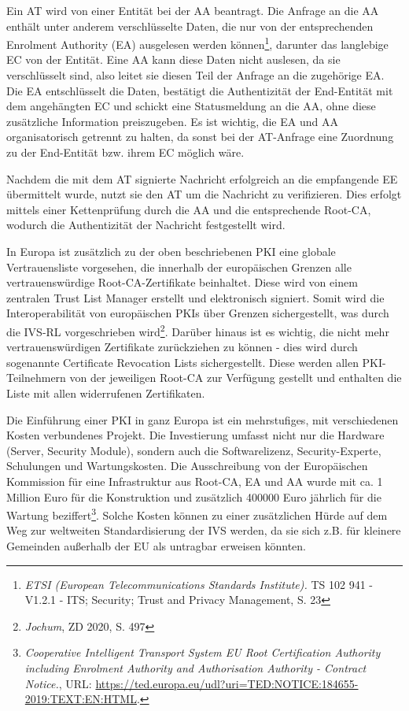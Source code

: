 Ein AT wird von einer Entität bei der AA beantragt. Die Anfrage an die AA enthält unter anderem verschlüsselte Daten, die nur von der entsprechenden Enrolment Authority (EA) ausgelesen werden können\footnote{\emph{ETSI (European Telecommunications Standards Institute).} TS 102 941 - V1.2.1 - ITS; Security; Trust and Privacy Management, S. 23}\nocite{ETSI2018}, darunter das langlebige EC von der Entität. Eine AA kann diese Daten nicht auslesen, da sie verschlüsselt sind, also leitet sie diesen Teil der Anfrage an die zugehörige EA. Die EA entschlüsselt die Daten, bestätigt die Authentizität der End-Entität mit dem angehängten EC und schickt eine Statusmeldung an die AA, ohne diese zusätzliche Information preiszugeben. Es ist wichtig, die EA und AA organisatorisch getrennt zu halten, da sonst bei der AT-Anfrage eine Zuordnung zu der End-Entität bzw. ihrem EC möglich wäre.

Nachdem die mit dem AT signierte Nachricht erfolgreich an die empfangende EE übermittelt wurde, nutzt sie den AT um die Nachricht zu verifizieren. Dies erfolgt mittels einer Kettenprüfung durch die AA und die entsprechende Root-CA, wodurch die Authentizität der Nachricht festgestellt wird.

In Europa ist zusätzlich zu der oben beschriebenen PKI eine globale Vertrauensliste vorgesehen, die innerhalb der europäischen Grenzen alle vertrauenswürdige Root-CA-Zertifikate beinhaltet. Diese wird von einem zentralen Trust List Manager erstellt und elektronisch signiert. Somit wird die Interoperabilität von europäischen PKIs über Grenzen sichergestellt, was durch die IVS-RL vorgeschrieben wird\footnote{\emph{Jochum}, ZD 2020, S. 497}. Darüber hinaus ist es wichtig, die nicht mehr vertrauenswürdigen Zertifikate zurückziehen zu können - dies wird durch sogenannte Certificate Revocation Lists sichergestellt. Diese werden allen PKI-Teilnehmern von der jeweiligen Root-CA zur Verfügung gestellt und enthalten die Liste mit allen widerrufenen Zertifikaten. 

Die Einführung einer PKI in ganz Europa ist ein mehrstufiges, mit verschiedenen Kosten verbundenes Projekt. Die Investierung umfasst nicht nur die Hardware (Server, Security Module), sondern auch die Softwarelizenz, Security-Experte, Schulungen und Wartungskosten. Die Ausschreibung von der Europäischen Kommission für eine Infrastruktur aus Root-CA, EA und AA wurde mit ca. 1 Million Euro für die Konstruktion und zusätzlich 400000 Euro jährlich für die Wartung beziffert\footnote{\emph{Cooperative Intelligent Transport System EU Root Certification Authority including Enrolment Authority and Authorisation Authority - Contract Notice.}, URL: \url{https://ted.europa.eu/udl?uri=TED:NOTICE:184655-2019:TEXT:EN:HTML}.}\nocite{Tender}. Solche Kosten können zu einer zusätzlichen Hürde auf dem Weg zur weltweiten Standardisierung der IVS werden, da sie sich z.B. für kleinere Gemeinden außerhalb der EU als untragbar erweisen könnten.

